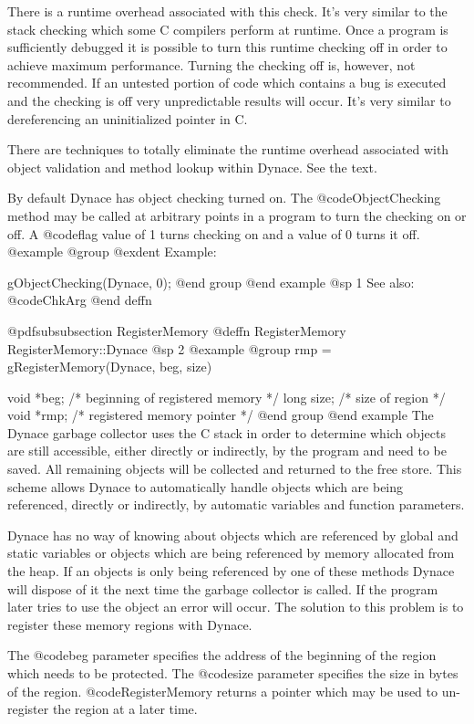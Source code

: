 There is a runtime overhead associated with this check.  It's very
similar to the stack checking which some C compilers perform at
runtime.  Once a program is sufficiently debugged it is possible
to turn this runtime checking off in order to achieve maximum
performance.  Turning the checking off is, however, not recommended.
If an untested portion of code which contains a bug is executed
and the checking is off very unpredictable results will occur.
It's very similar to dereferencing an uninitialized pointer in C.

There are techniques to totally eliminate the runtime overhead
associated with object validation and method lookup within Dynace.
See the text.

By default Dynace has object checking turned on.  The @code{ObjectChecking}
method may be called at arbitrary points in a program to turn the checking
on or off.  A @code{flag} value of 1 turns checking on and a value of 0
turns it off.
@example
@group
@exdent Example:

gObjectChecking(Dynace, 0);
@end group
@end example
@sp 1
See also:  @code{ChkArg}
@end deffn





@pdfsubsubsection {RegisterMemory}
@deffn {RegisterMemory} RegisterMemory::Dynace
@sp 2
@example
@group
rmp = gRegisterMemory(Dynace, beg, size)

void    *beg;   /*  beginning of registered memory  */
long    size;   /*  size of region      */
void    *rmp;   /*  registered memory pointer  */
@end group
@end example
The Dynace garbage collector uses the C stack in order to determine which
objects are still accessible, either directly or indirectly, by the
program and need to be saved.  All remaining objects will be collected
and returned to the free store.  This scheme allows Dynace to automatically
handle objects which are being referenced, directly or indirectly, by
automatic variables and function parameters.

Dynace has no way of knowing about objects which are referenced by global
and static variables or objects which are being referenced by memory
allocated from the heap.  If an objects is only being referenced by
one of these methods Dynace will dispose of it the next time the
garbage collector is called.  If the program later tries to use the
object an error will occur.  The solution to this problem is to
register these memory regions with Dynace.

The @code{beg} parameter specifies the address of the beginning of the
region which needs to be protected.  The @code{size} parameter specifies
the size in bytes of the region.  @code{RegisterMemory} returns a pointer
which may be used to un-register the region at a later time.

